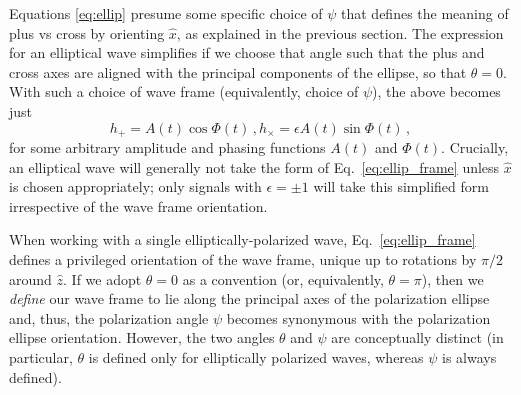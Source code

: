 \documentclass[aps,prd,twocolumn,superscriptaddress,preprintnumbers,floatfix,nofootinbib]{revtex4-2}
\newcommand{\beq}{\begin{equation}}
\newcommand{\eeq}{\end{equation}}
\begin{document}
Equations \eqref{eq:ellip} presume some specific choice of $\psi$ that defines the meaning of plus vs cross by orienting $\hat{x}$, as explained in the previous section.
The expression for an elliptical wave simplifies if we choose that angle such that the plus and cross axes are aligned with the principal components of the ellipse, so that $\theta = 0$.
With such a choice of wave frame (equivalently, choice of $\psi$), the above becomes just
\begin{subequations} \label{eq:ellip_frame}
\beq
h_+ = A(t) \cos \Phi(t) \, ,
\eeq
\beq
h_\times = \epsilon A(t) \sin \Phi(t)\, ,
\eeq
\end{subequations}
for some arbitrary amplitude and phasing functions $A(t)$ and $\Phi(t)$.
Crucially, an elliptical wave will generally not take the form of Eq.~\eqref{eq:ellip_frame} unless $\hat{x}$ is chosen appropriately; only signals with $\epsilon=\pm1$ will take  this simplified form irrespective of the wave frame orientation.

When working with a single elliptically-polarized wave, Eq.~\eqref{eq:ellip_frame} defines a privileged orientation of the wave frame, unique up to rotations by $\pi/2$ around $\hat{z}$.
If we adopt $\theta =0$ as a convention (or, equivalently, $\theta=\pi$), then we \emph{define} our wave frame to lie along the principal axes of the polarization ellipse and, thus, the polarization angle $\psi$ becomes synonymous with the polarization ellipse orientation.
However, the two angles $\theta$ and $\psi$ are conceptually distinct (in particular, $\theta$ is defined only for elliptically polarized waves, whereas $\psi$ is always defined).

\end{document}
